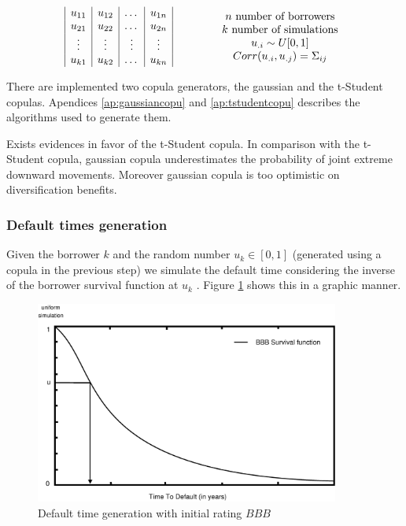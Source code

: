 \documentclass[a4paper,12pt,final]{article}
\begin{document}
\begin{displaymath}
\begin{array}{ccc}
\begin{array}{|c|c|c|c|}
u_{11} & u_{12} & \dots  & u_{1n} \cr
u_{21} & u_{22} & \dots  & u_{2n} \cr
\vdots & \vdots & \vdots & \vdots \cr
u_{k1} & u_{k2} & \dots  & u_{kn} \cr
\end{array}
&
\qquad
&
\begin{array}{c}
n \textrm{ number of borrowers} \cr
k \textrm{ number of simulations} \cr
u_{.i} \sim U[0,1] \cr
Corr(u_{.i}, u_{.j}) = \Sigma_{ij} \cr
\end{array}
\end{array}
\end{displaymath}

There are implemented two copula generators, the gaussian and the t-Student
copulas. Apendices \ref{ap:gaussiancopu} and \ref{ap:tstudentcopu} describes the 
algorithms used to generate them.
\newline

Exists evidences \cite{copu:selecting} in favor of the t-Student copula. 
In comparison with the t-Student copula, gaussian copula underestimates the probability 
of joint extreme downward movements. Moreover gaussian copula is too optimistic on 
diversiﬁcation benefits.

\subsubsection{Default times generation}
Given the borrower $k$ and the random number $u_k \in [0,1]$ (generated using a 
copula in the previous step) we simulate the default time considering the 
inverse of the borrower survival function at $u_k$ \cite{ref:cred_risk}. 
Figure \ref{simttd} shows this in a graphic manner.

\begin{figure}[!hbt]
\begin{center}
\includegraphics[width=10cm,angle=0]{./images/simttd.eps}
\caption{Default time generation with initial rating $BBB$}
\label{simttd}
\end{center}
\end{figure}
\FloatBarrier
\end{document}
